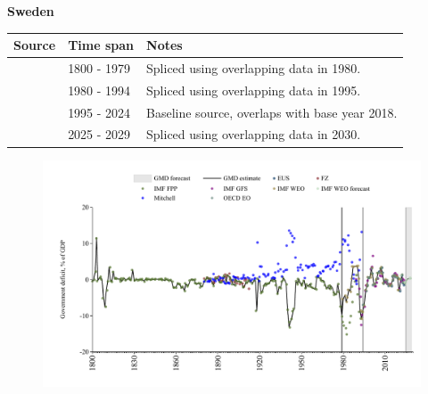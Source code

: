 \documentclass[12pt,a4paper,landscape]{article}
\begin{document}
\begin{adjustbox}{max totalsize={\paperwidth}{\paperheight},center}
\begin{minipage}[t][\textheight][t]{\textwidth}
\vspace*{0.5cm}
{}
\begin{center}
{\Large\bfseries Sweden}
\end{center}
\vspace{0.5cm}
\begin{table}[H]
\centering
\small
\begin{tabular}{|l|l|l|}
\hline
\textbf{Source} & \textbf{Time span} & \textbf{Notes} \\
\hline
\rowcolor{white}\cite{IMF_FPP}& 1800 - 1979 &Spliced using overlapping data in 1980.\\
\rowcolor{lightgray}\cite{IMF_WEO}& 1980 - 1994 &Spliced using overlapping data in 1995.\\
\rowcolor{white}\cite{EUS}& 1995 - 2024 &Baseline source, overlaps with base year 2018.\\
\rowcolor{lightgray}\cite{IMF_WEO_forecast}& 2025 - 2029 &Spliced using overlapping data in 2030.\\
\hline
\end{tabular}
\end{table}
\begin{figure}[H]
\centering
\includegraphics[width=\textwidth,height=0.6\textheight,keepaspectratio]{graphs/SWE_govdef_GDP.pdf}
\end{figure}
\end{minipage}
\end{adjustbox}
\end{document}
